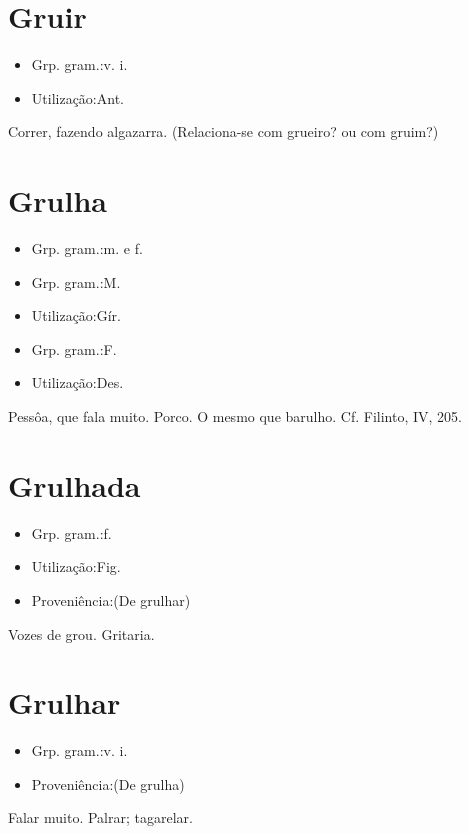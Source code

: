 \section{Gruir}
\begin{itemize}
\item {Grp. gram.:v. i.}
\end{itemize}
\begin{itemize}
\item {Utilização:Ant.}
\end{itemize}
Correr, fazendo algazarra.
(Relaciona-se com \textunderscore grueiro\textunderscore ? ou com \textunderscore gruim\textunderscore ?)
\section{Grulha}
\begin{itemize}
\item {Grp. gram.:m.  e  f.}
\end{itemize}
\begin{itemize}
\item {Grp. gram.:M.}
\end{itemize}
\begin{itemize}
\item {Utilização:Gír.}
\end{itemize}
\begin{itemize}
\item {Grp. gram.:F.}
\end{itemize}
\begin{itemize}
\item {Utilização:Des.}
\end{itemize}
Pessôa, que fala muito.
Porco.
O mesmo que \textunderscore barulho\textunderscore . Cf. Filinto, IV, 205.
\section{Grulhada}
\begin{itemize}
\item {Grp. gram.:f.}
\end{itemize}
\begin{itemize}
\item {Utilização:Fig.}
\end{itemize}
\begin{itemize}
\item {Proveniência:(De \textunderscore grulhar\textunderscore )}
\end{itemize}
Vozes de grou.
Gritaria.
\section{Grulhar}
\begin{itemize}
\item {Grp. gram.:v. i.}
\end{itemize}
\begin{itemize}
\item {Proveniência:(De \textunderscore grulha\textunderscore )}
\end{itemize}
Falar muito.
Palrar; tagarelar.

